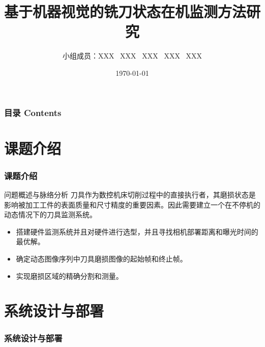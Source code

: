 \documentclass[aspectratio=169,t,xcolor=table,10pt]{ctexbeamer}
\title{\Huge{基于机器视觉的铣刀状态在机监测方法研究}}
\author{\large{小组成员：XXX \ XXX \ XXX \ XXX \ XXX}}
\institute{\large{仪器科学与光电工程学院 }}
\date{\today}
\numberwithin{equation}{section} %
\begin{document}
	
	\frame[noframenumbering]{\titlepage}
	
	
	\begin{frame}
		\frametitle{目录 Contents}
		\begin{center}
			\large{
				\tableofcontents[hideallsubsections]
			}
		\end{center}
	\end{frame}


	\section{课题介绍}
	\begin{frame}
		\frametitle{课题介绍}
	\end{frame}

	\begin{frame}
		\begin{block}{问题概述与脉络分析}
			\qquad 刀具作为数控机床切削过程中的直接执行者，其磨损状态是影响被加工工件的表面质量和尺寸精度的重要因素。因此需要建立一个在不停机的动态情况下的刀具监测系统。
			\begin{itemize}[<+->]
				\item 搭建硬件监测系统并且对硬件进行选型，并且寻找相机部署距离和曝光时间的最优解。
				\item 确定动态图像序列中刀具磨损图像的起始帧和终止帧。
				\item 实现磨损区域的精确分割和测量。
			\end{itemize}
		\end{block}
	\end{frame}
	

	\section{系统设计与部署}
	\begin{frame}
		\frametitle{系统设计与部署}
	\end{frame}
	
\end{document}
